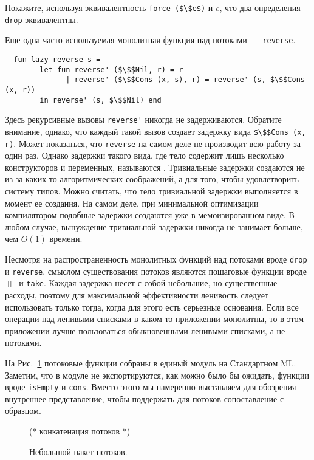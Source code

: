 \begin{exercise}\label{ex:4-1}
  Покажите, используя эквивалентность \lstinline!force ($\$e$)! и $e$,
  что два определения \lstinline!drop! эквивалентны. 
\end{exercise}

Еще одна часто используемая монолитная функция над потоками~---
\lstinline!reverse!.
\begin{lstlisting}
  fun lazy reverse s =
        let fun reverse' ($\$$Nil, r) = r
              | reverse' ($\$$Cons (x, s), r) = reverse' (s, $\$$Cons (x, r))
        in reverse' (s, $\$$Nil) end
\end{lstlisting}
Здесь рекурсивные вызовы \lstinline!reverse'! никогда не
задерживаются. Обратите внимание, однако, что каждый такой вызов
создает задержку вида \lstinline!$\$$Cons (x, r)!. Может показаться,
что \lstinline!reverse! на самом деле не производит всю работу за один
раз. Однако задержки такого вида, где тело содержит лишь
несколько конструкторов и переменных, называются
. Тривиальные задержки создаются не из-за
каких-то алгоритмических соображений, а для того, чтобы удовлетворить
систему типов. Можно считать, что тело тривиальной задержки
выполняется в момент ее создания.  На самом деле, при минимальной
оптимизации компилятором подобные задержки создаются уже в
мемоизированном виде. В любом случае, вынуждение тривиальной
задержки никогда не занимает больше, чем $O(1)$ времени.

Несмотря на распространенность монолитных функций над потоками вроде
\lstinline!drop! и \lstinline!reverse!, смыслом существования потоков
являются пошаговые функции вроде $+\!\!\!+\,$ и \lstinline!take!. Каждая
задержка несет с собой небольшие, но существенные расходы, поэтому для
максимальной эффективности ленивость следует использовать только тогда,
когда для этого есть серьезные основания. Если все операции над
ленивыми списками в каком-то приложении монолитны, то в этом
приложении лучше пользоваться обыкновенными ленивыми списками, а не
потоками.

На Рис.~\ref{fig:4-1} потоковые функции собраны в единый модуль на
Стандартном ML. Заметим, что в модуле не экспортируются, как можно
было бы ожидать,  функции вроде \lstinline!isEmpty! и
\lstinline!cons!. Вместо этого мы намеренно выставляем для обозрения
внутреннее представление, чтобы поддержать для потоков сопоставление с
образцом. 

\begin{figure}
  \centering
  
  (* конкатенация потоков *)
  
  \caption{Небольшой пакет потоков.}
  \label{fig:4-1}
\end{figure}

